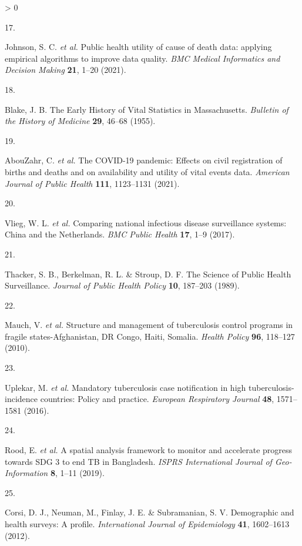 \documentclass[
]{article}
\newlength{\cslhangindent}
\newlength{\csllabelwidth}
\newenvironment{CSLReferences}[2] %
 {%
  \setlength{\parindent}{0pt}
  \ifodd #1 \everypar{\setlength{\hangindent}{\cslhangindent}}\ignorespaces\fi
  \ifnum #2 > 0
  \setlength{\parskip}{#2\baselineskip}
  \fi
 }%
 {}
\newcommand{\CSLLeftMargin}[1]{\parbox[t]{\csllabelwidth}{#1}}
\newcommand{\CSLRightInline}[1]{\parbox[t]{\linewidth - \csllabelwidth}{#1}\break}
\begin{document}
\begin{CSLReferences}{0}{0}
\leavevmode\hypertarget{ref-Johnson2021}{}%
\CSLLeftMargin{17. }
\CSLRightInline{Johnson, S. C. \emph{et al.} {Public health utility of cause of death data: applying empirical algorithms to improve data quality}. \emph{BMC Medical Informatics and Decision Making} \textbf{21}, 1--20 (2021).}

\leavevmode\hypertarget{ref-Blake1955}{}%
\CSLLeftMargin{18. }
\CSLRightInline{Blake, J. B. {The Early History of Vital Statistics in Massachusetts}. \emph{Bulletin of the History of Medicine} \textbf{29}, 46--68 (1955).}

\leavevmode\hypertarget{ref-AbouZahr2021}{}%
\CSLLeftMargin{19. }
\CSLRightInline{AbouZahr, C. \emph{et al.} {The COVID-19 pandemic: Effects on civil registration of births and deaths and on availability and utility of vital events data}. \emph{American Journal of Public Health} \textbf{111}, 1123--1131 (2021).}

\leavevmode\hypertarget{ref-Vlieg2017}{}%
\CSLLeftMargin{20. }
\CSLRightInline{Vlieg, W. L. \emph{et al.} {Comparing national infectious disease surveillance systems: China and the Netherlands}. \emph{BMC Public Health} \textbf{17}, 1--9 (2017).}

\leavevmode\hypertarget{ref-Thacker1989}{}%
\CSLLeftMargin{21. }
\CSLRightInline{Thacker, S. B., Berkelman, R. L. \& Stroup, D. F. {The Science of Public Health Surveillance}. \emph{Journal of Public Health Policy} \textbf{10}, 187--203 (1989).}

\leavevmode\hypertarget{ref-Mauch2010}{}%
\CSLLeftMargin{22. }
\CSLRightInline{Mauch, V. \emph{et al.} {Structure and management of tuberculosis control programs in fragile states-Afghanistan, DR Congo, Haiti, Somalia}. \emph{Health Policy} \textbf{96}, 118--127 (2010).}

\leavevmode\hypertarget{ref-Uplekar2016}{}%
\CSLLeftMargin{23. }
\CSLRightInline{Uplekar, M. \emph{et al.} {Mandatory tuberculosis case notification in high tuberculosis-incidence countries: Policy and practice}. \emph{European Respiratory Journal} \textbf{48}, 1571--1581 (2016).}

\leavevmode\hypertarget{ref-Rood2019}{}%
\CSLLeftMargin{24. }
\CSLRightInline{Rood, E. \emph{et al.} {A spatial analysis framework to monitor and accelerate progress towards SDG 3 to end TB in Bangladesh}. \emph{ISPRS International Journal of Geo-Information} \textbf{8}, 1--11 (2019).}

\leavevmode\hypertarget{ref-Corsi2012}{}%
\CSLLeftMargin{25. }
\CSLRightInline{Corsi, D. J., Neuman, M., Finlay, J. E. \& Subramanian, S. V. {Demographic and health surveys: A profile}. \emph{International Journal of Epidemiology} \textbf{41}, 1602--1613 (2012).}


\end{CSLReferences}
\end{document}
